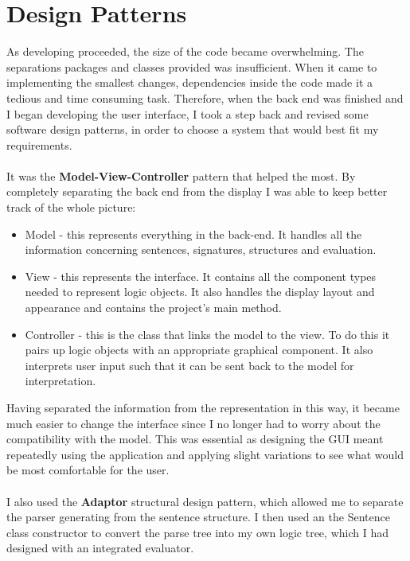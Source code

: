 \documentclass{report}
\begin{document}
\section{Design Patterns}
As developing proceeded, the size of the code became overwhelming. The 
separations packages and classes provided was insufficient. When it came to 
implementing the smallest changes, dependencies inside the code made it a 
tedious and time consuming task. Therefore, when the back end was finished and I 
began developing the user interface, I took a step back and revised some 
software design patterns, in order to choose a system that would best fit my 
requirements. 
\\ \\
It was the \textbf{Model-View-Controller} pattern that helped the most. By 
completely separating the back end from the display I was able to keep better 
track of the whole picture:
\begin{itemize}
\item Model - this represents everything in the back-end. It handles all the 
information concerning sentences, signatures, structures and evaluation. 
\item View - this represents the interface. It contains all the component 
types needed to represent logic objects. It also handles the display layout and 
appearance and contains the project's main method.
\item Controller - this is the class that links the model to the view. To do 
this it pairs up logic objects with an appropriate graphical component. It also 
interprets user input such that it can be sent back to the model for 
interpretation. 
\end{itemize}
Having separated the information from the representation in this way, it became 
much easier to change the interface since I no longer had to worry about the 
compatibility with the model. This was essential as designing the GUI meant 
repeatedly using the application and applying slight variations to see what 
would be most comfortable for the user. 
\\ \\
I also used the \textbf{Adaptor} structural design pattern, which allowed me to 
separate the parser generating from the sentence structure. I then used an the 
Sentence class constructor to convert the parse tree into my own logic tree, 
which I had designed with an integrated evaluator. 
\\ \\
\end{document}
